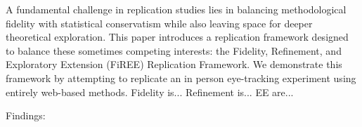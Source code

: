 A fundamental challenge in replication studies lies in balancing methodological fidelity with statistical conservatism while also leaving space for deeper theoretical exploration. This paper introduces a replication framework designed to balance these sometimes competing interests: the Fidelity, Refinement, and Exploratory Extension (FiREE) Replication Framework. We demonstrate this framework by attempting to replicate an in person eye-tracking experiment \citep{Ge2021} using entirely web-based methods. 
Fidelity is...
Refinement is...
EE are...

Findings:
